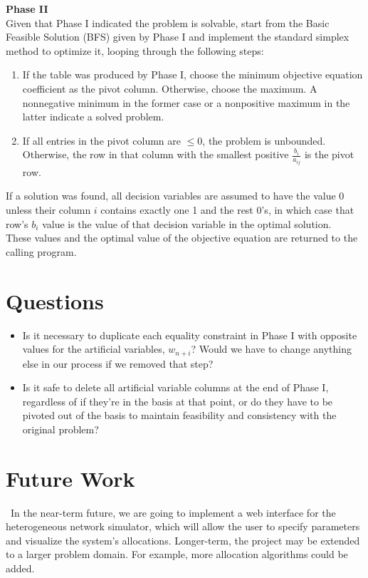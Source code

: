 \documentclass[11pt]{article}
\begin{document}
\noindent \textbf{Phase II}\\
Given that Phase I indicated the problem is solvable, start from the Basic Feasible Solution (BFS) given by Phase I and implement the standard simplex method to optimize it, looping through the following steps:~\cite{chvatal83}~\cite{wolfram}
\begin{enumerate}
\item If the table was produced by Phase I, choose the minimum objective equation coefficient as the pivot column. Otherwise, choose the maximum. A nonnegative minimum in the former case or a nonpositive maximum in the latter indicate a solved problem.
\item If all entries in the pivot column are $\leq 0$, the problem is unbounded. Otherwise, the row in that column with the smallest positive $\frac{b_i}{a_{ij}}$ is the pivot row.
\end{enumerate}
If a solution was found, all decision variables are assumed to have the value 0 unless their column $i$ contains exactly one 1 and the rest 0's, in which case that row's $b_i$ value is the value of that decision variable in the optimal solution.~\cite{chvatal83} These values and the optimal value of the objective equation are returned to the calling program.

\section{Questions}

\begin{itemize}
\item Is it necessary to duplicate each equality constraint in Phase I with opposite values for the artificial variables, $w_{n+i}$? Would we have to change anything else in our process if we removed that step?
\item Is it safe to delete all artificial variable columns at the end of Phase I, regardless of if they're in the basis at that point, or do they have to be pivoted out of the basis to maintain feasibility and consistency with the original problem?
\end{itemize}

\section{Future Work}

~\indent In the near-term future, we are going to implement a web interface for the heterogeneous network simulator, which will allow the user to specify parameters and visualize the system's allocations. Longer-term, the project may be extended to a larger problem domain. For example, more allocation algorithms could be added.
\end{document}

